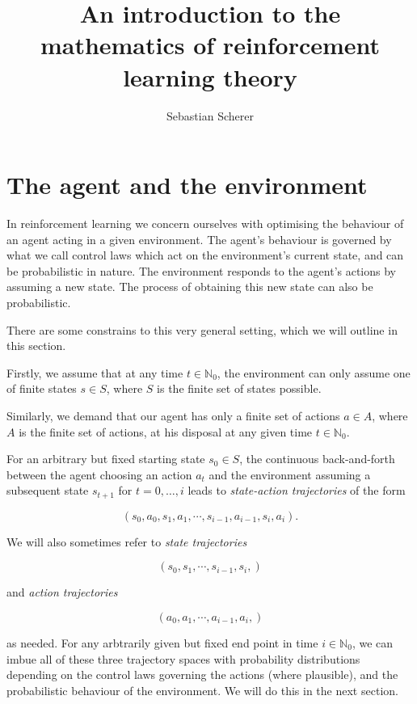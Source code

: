 \documentclass[11pt]{article} %
\title{An introduction to the mathematics of reinforcement learning theory}
\author{Sebastian Scherer}
\begin{document}
\maketitle

\section{The agent and the environment}

In reinforcement learning we concern ourselves with optimising the behaviour of an agent acting in a given environment. The agent's behaviour is governed by what we call control laws which act on the environment's current state, and can be probabilistic in nature. The environment responds to the agent's actions by assuming a new state. The process of obtaining this new state can also be probabilistic. 

There are some constrains to this very general setting, which we will outline in this section. 

Firstly, we assume that at any time $t \in \mathbb{N}_0$, the environment can only assume one of finite states $s \in S$, where $S$ is the finite set of states possible. 

Similarly, we demand that our agent has only a finite set of actions $a \in A$, where $A$ is the finite set of actions, at his disposal at any given time $t \in \mathbb{N}_0$.

For an arbitrary but fixed starting state $s_0 \in S$, the continuous back-and-forth between the agent choosing an action $a_t$ and the environment assuming a subsequent state $s_{t+1}$ for $t=0,\dots,i$ leads to \textit{state-action trajectories} of the form

\begin{equation}\label{stateActionTraj}
	(s_0, a_0, s_1, a_1, \cdots, s_{i-1},a_{i-1},s_i,a_i).
\end{equation}

We will also sometimes refer to \textit{state trajectories}

\begin{equation}\label{stateActionTraj}
	(s_0, s_1, \cdots, s_{i-1},s_i,)
\end{equation}

 and \textit{action trajectories}

\begin{equation}\label{actionTraj}
	(a_0, a_1, \cdots, a_{i-1},a_i,)
\end{equation}

as needed. For any arbtrarily given but fixed end point in time $i \in \mathbb{N}_0$, we can imbue all of these three trajectory spaces with probability distributions depending on the control laws governing the actions (where plausible), and the probabilistic behaviour of the environment. We will do this in the next section.
\end{document}
